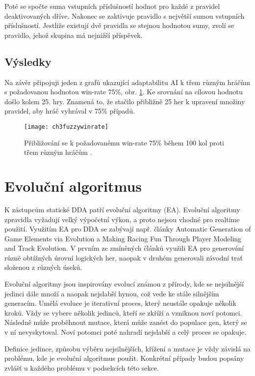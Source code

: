 Poté se spočte suma vstupních příslušností hodnot pro každé z pravidel deaktivovaných dříve. Nakonec se zaktivuje pravidlo s největší sumou vstupních příslušností. Jestliže existují dvě pravidla se stejnou hodnotou sumy, zvolí se pravidlo, jehož skupina má nejnižší příspěvek.

\subsection{Výsledky}

Na závěr připojuji jeden z grafů ukazující adaptabilitu AI k třem různým hráčům s požadovanou hodnotou win-rate 75\%, obr. \ref{fig-ch3fuzzywinrate}. Ke srovnání na cílovou hodnotu došlo kolem 25. hry. Znamená to, že stačilo přibližně 25 her k upravení množiny pravidel, aby hráč vyhrával v 75\% případů.

\begin{figure}
  \centering
  \texttt{[image: ch3fuzzywinrate]}
	\caption{Přibližování se k požadovanému win-rate 75\% během 100 kol proti třem různým hráčům \cite{25deadend}. }
	\label{fig-ch3fuzzywinrate}
\end{figure}

\section{Evoluční algoritmus} \label{sec:evol}

K zástupcům statické DDA patří evoluční algoritmy (EA). Evoluční algoritmy zpravidla vyžadují velký výpočetní výkon, a proto nejsou vhodné pro realtime použití. Využitím EA pro DDA se zabývají např. články Automatic Generation of Game Elements via Evolution\cite{17Evol} a Making Racing Fun Through Player Modeling
and Track Evolution\cite{EvolTrack}. V prvním ze zmíněných článků využili EA pro generování různě obtížných úrovní logických her, naopak v druhém generovali závodní trať složenou z různých úseků.

Evoluční algoritmy jsou inspirovány evolucí známou z přírody, kde se nejsilnější jedinci dále množí a naopak nejslabší hynou, což vede ke stále silnějším generacím. Umělá evoluce je iterativní proces, který neustále opakuje několik kroků. Vždy se vybere několik jedinců, kteří se zkříží a vzniknou noví potomci. Následně může proběhnout mutace, která může zanést do populace gen, který se v ní nevyskytoval. Noví potomci poté nahradí nejslabší a celý proces se opakuje.

Definice jedince, způsobu výběru nejsilnějších, křížení a mutace je vždy závislá na problému, kde je evoluční algoritmus použit. Konkrétní případy budou popsány zvlášť u každého problému v podsekcích této sekce.

